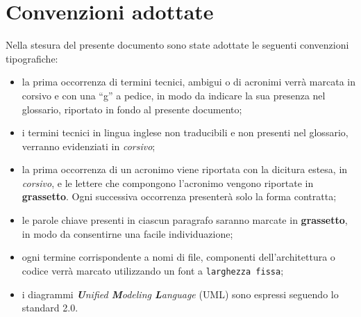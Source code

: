 \section{Convenzioni adottate}
Nella stesura del presente documento sono state adottate le seguenti convenzioni
tipografiche:
\begin{itemize}
	\item la prima occorrenza di termini tecnici, ambigui o di acronimi verrà marcata in corsivo	e con una ``g'' a pedice, in modo da indicare la sua presenza nel glossario, riportato in fondo al presente documento;
	\item i termini tecnici in lingua inglese non traducibili e non presenti nel glossario, verranno evidenziati in \emph{corsivo};
	\item la prima occorrenza di un acronimo viene riportata con la dicitura estesa, in
	\emph{corsivo}, e le lettere che compongono l’acronimo vengono riportate in \textbf{grassetto}. Ogni successiva occorrenza presenterà solo la forma contratta;
	\item le parole chiave presenti in ciascun paragrafo saranno marcate in \textbf{grassetto}, in modo da consentirne una facile individuazione;
	\item ogni termine corrispondente a nomi di file, componenti dell’architettura o codice verrà marcato utilizzando un font a \texttt{larghezza fissa};
	\item i diagrammi \emph{\textbf{U}nified \textbf{M}odeling \textbf{L}anguage} (\acrshort{UML}) sono espressi seguendo lo standard 2.0.
\end{itemize}
